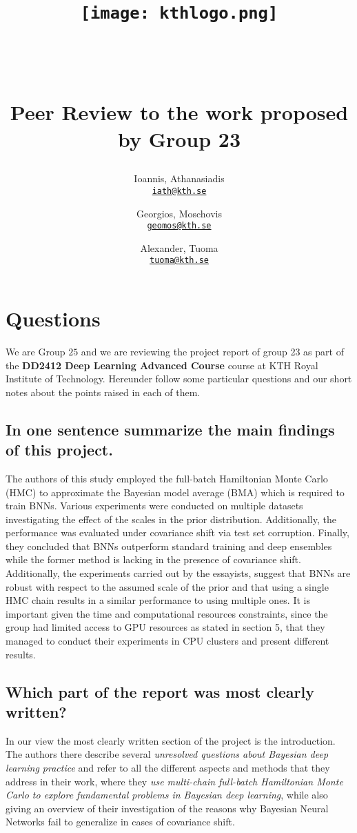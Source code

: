 \documentclass{article}
\title{\begin{figure}[h]
    \centering
    \texttt{[image: kthlogo.png]}
    \label{fig:viterbi trace}
\end{figure} \\ \\

Peer Review to the work proposed by Group 23}
\author{
  Ioannis, Athanasiadis\\
  \texttt{\href{mailto:iath@kth.se}{iath@kth.se}}
  \and
   Georgios, Moschovis\\
  \texttt{\href{mailto:geomos@kth.se}{geomos@kth.se}}
  \and 
  Alexander, Tuoma \\
  \texttt{\href{mailto:tuoma@kth.se}{tuoma@kth.se}}
}
\begin{document}
\maketitle


\section {Questions}
We are Group $25$ and we are reviewing the project report of group 23 as part of the \textbf{DD2412 Deep Learning Advanced Course} course at KTH Royal Institute of Technology. Hereunder follow some particular questions and our short notes about the points raised in each of them.

\subsection{In one sentence summarize the main findings of this project.}
The authors of this study employed the full-batch Hamiltonian Monte Carlo (HMC) to approximate the Bayesian model average (BMA) which is required to train BNNs. Various experiments were conducted on multiple datasets investigating the effect of the scales in the prior distribution. Additionally, the performance was evaluated under covariance shift via test set corruption. Finally, they concluded that BNNs outperform standard training and deep ensembles while the former method is lacking in the presence of covariance shift. Additionally, the experiments carried out by the essayists, suggest that BNNs are robust with respect to the assumed scale of the prior and that using a single HMC chain results in a similar performance to using multiple ones. It is important given the time and computational resources constraints, since the group had limited access to GPU resources as stated in section 5, that they managed to conduct their experiments in CPU clusters and present different results.



\subsection{Which part of the report was most clearly written?}
In our view the most clearly written section of the project is the introduction. The authors there describe several \textit{unresolved questions about Bayesian deep learning practice} and refer to all the different aspects and methods that they address in their work, where they \textit{use multi-chain full-batch Hamiltonian Monte Carlo to explore fundamental
problems in Bayesian deep learning}, while also giving an overview of their investigation of the reasons why Bayesian Neural Networks fail to generalize in cases of covariance shift.
\end{document}
